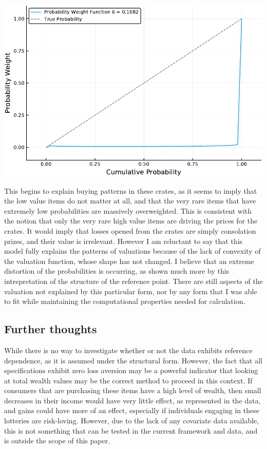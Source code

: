 \documentclass[12pt, letterpaper]{paper}
\begin{document}
\includegraphics[width=.9\linewidth]{../Scripts/ProbWeightExpVal.pdf}

This begins to explain buying patterns in these crates, as it seems to
imply that the low value items do not matter at all, and that the very
rare items that have extremely low probabilities are massively
overweighted. This is consistent with the notion that only the very
rare high value items are driving the prices for the crates. It would
imply that losses opened from the crates are simply consolation
prizes, and their value is irrelevant. However I am reluctant to say
that this model fully explains the patterns of valuations because of
the lack of convexity of the valuation function, whose shape has not
changed. I believe that an extreme distortion of the probabilities is
occurring, as shown much more by this intrepretation of the structure
of the reference point. There are still aspects of the valuation not
explained by this particular form, nor by any form that I was able to
fit while maintaining the computational properties needed for
calculation.

\subsection{Further thoughts}
\label{sec-5-3}

While there is no way to investigate whether or not the data exhibits
reference dependence, as it is assumed under the structural
form. However, the fact that all specifications exhibit zero loss
aversion may be a powerful indicator that looking at total wealth
values may be the correct method to proceed in this context. If
consumers that are purchasing these items have a high level of wealth,
then small decreases in their income would have very little effect, as
represented in the data, and gains could have more of an effect,
especially if individuals engaging in these lotteries are
risk-loving. However, due to the lack of any covariate data available,
this is not something that can be tested in the current framework and
data, and is outside the scope of this paper.
\end{document}
